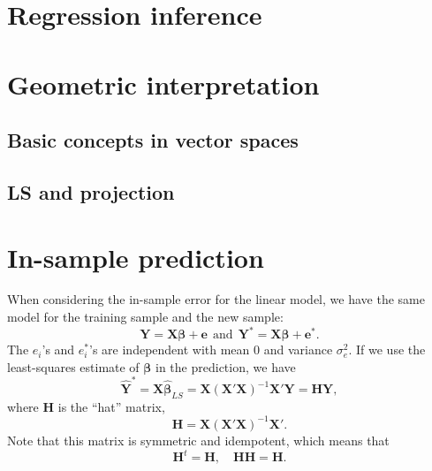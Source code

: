 \documentclass[
]{book}
\begin{document}
\hypertarget{regression-inference}{%
\section{Regression inference}\label{regression-inference}}

\hypertarget{geometric-interpretation}{%
\section{Geometric interpretation}\label{geometric-interpretation}}

\hypertarget{basic-concepts-in-vector-spaces}{%
\subsection{Basic concepts in vector spaces}\label{basic-concepts-in-vector-spaces}}

\hypertarget{ls-and-projection}{%
\subsection{LS and projection}\label{ls-and-projection}}

\hypertarget{in-sample-prediction}{%
\section{In-sample prediction}\label{in-sample-prediction}}

When considering the in-sample error for the linear model, we have the same model for the training sample and the new sample:
\begin{equation}
\mathbf{Y}=\mathbf{X}\boldsymbol{\beta}+\mathbf{e}~~\mbox{and}~~\mathbf{Y}^{*} = \mathbf{X}\boldsymbol{\beta}+\mathbf{e}^{*}.
\label{eq:predls1}
\end{equation}
The \(e_i\)'s and \(e^{*}_i\)'s are independent with mean 0 and variance \(\sigma^2_e\). If we use the least-squares estimate of \(\boldsymbol{\beta}\) in the prediction, we have
\begin{equation}
\widehat{\mathbf{Y}}^{*} = \mathbf{X}\widehat{\boldsymbol{\beta}}_{LS} = \mathbf{X}(\mathbf{X}'\mathbf{X})^{-1}\mathbf{X}'\mathbf{Y} = \mathbf{H}\mathbf{Y},
\label{eq:predls2}
\end{equation}
where \(\mathbf{H}\) is the ``hat'' matrix,
\begin{equation} 
\mathbf{H} = \mathbf{X}(\mathbf{X}'\mathbf{X})^{-1}\mathbf{X}'.
\label{eq:H}
\end{equation}
Note that this matrix is symmetric and idempotent, which means that
\begin{equation}
\mathbf{H}^t = \mathbf{H}, \quad 
\mathbf{H}\mathbf{H}=\mathbf{H}.
\label{eq:predls3-1}
\end{equation}
\end{document}
